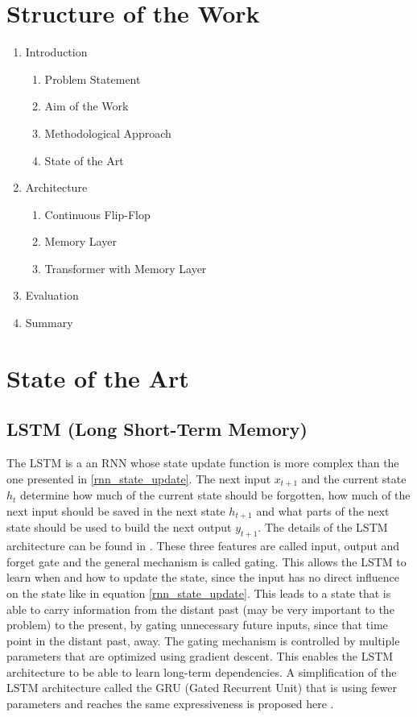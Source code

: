 \documentclass{article}
\begin{document}
\section{Structure of the Work}
\begin{enumerate}
    \item{Introduction}
    \begin{enumerate}
        \item{Problem Statement}
        \item{Aim of the Work}
        \item{Methodological Approach}
        \item{State of the Art}
    \end{enumerate}
    \item{Architecture}
    \begin{enumerate}
        \item{Continuous Flip-Flop}
        \item{Memory Layer}
        \item{Transformer with Memory Layer}
    \end{enumerate}
    \item{Evaluation}
    \item{Summary}
\end{enumerate}
\section{State of the Art}
\subsection{LSTM (Long Short-Term Memory)}
The LSTM is a an RNN whose state update function is more complex than the one presented in \ref{rnn_state_update}. 
The next input $x_{t+1}$ and the current state $h_{t}$ determine how much of the current state should be forgotten, how much of the next input should be saved in the next state $h_{t+1}$ and what parts of the next state should be used to build the next output $y_{t+1}$.
The details of the LSTM architecture can be found in \cite{LSTM}. 
These three features are called input, output and forget gate and the general mechanism is called gating.
This allows the LSTM to learn when and how to update the state, since the input has no direct influence on the state like in equation \ref{rnn_state_update}. 
This leads to a state that is able to carry information from the distant past (may be very important to the problem) to the present, by gating unnecessary future inputs, since that time point in the distant past, away.
The gating mechanism is controlled by multiple parameters that are optimized using gradient descent. 
This enables the LSTM architecture to be able to learn long-term dependencies.
A simplification of the LSTM architecture called the GRU (Gated Recurrent Unit) that is using fewer parameters and reaches the same expressiveness is proposed here \cite{GRU}.
\end{document}

